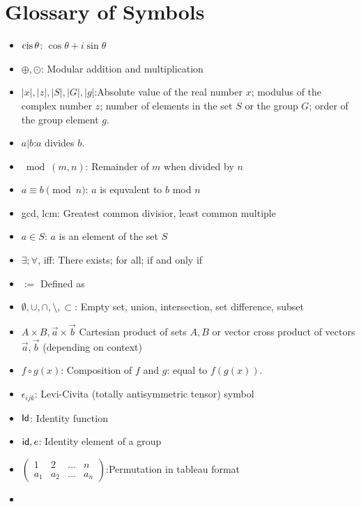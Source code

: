 \chapter*{Glossary of Symbols}\label{glossaryOfSymbols}

\begin{itemize}
\item[]
$\operatorname{cis} \theta$: \quad $\cos \theta + i \sin \theta$
\item[]
$\oplus, \odot$: \quad Modular addition and multiplication
\item[]
$|x|,|z|,|S|,|G|,|g|$:\quad Absolute value of the real number $x$; modulus of the complex number $z$; number of elements in the set $S$ or the group $G$; order of the group element $g$. 
\item[]
$a | b$:\quad $a$ divides $b$.
\item[]
 $\bmod(m,n)$: \quad Remainder of $m$ when divided by $n$
\item[]
$a \equiv b \pmod n $: \quad $a$ is equvalent to $b$ mod $n$
\item[]
gcd, lcm: \quad Greatest common divisior, least common multiple
\item[]
$a \in S$: \quad $a$ is an element of the set $S$
\item[]
$\exists; \forall$, iff: \quad There exists; for all; if and only if
\item[]
$:=$ \quad Defined as
\item[]
$\emptyset, \cup, \cap, \setminus, \subset$: \quad Empty set, union, intersection, set difference, subset
\item[]
$A\times B, \vec{a} \times \vec{b}$ \quad Cartesian product of sets $A,B$ or vector cross product of vectors $\vec{a},\vec{b}$ (depending on context)
\item[]
$f \circ g(x)$: \quad Composition of $f$ and $g$: equal to $f(g(x))$.
\item[]
$\epsilon_{ijk}$: \quad Levi-Civita (totally antisymmetric tensor) symbol
\item[]
${\sf{I}d}$: \quad Identity function
\item[]
${\sf{i}d}, e$: \quad Identity element of a group
\item[]
$\begin{pmatrix} 1 & 2 & \ldots & n\\ a_1 & a_2 & \ldots & a_n \end{pmatrix}$:\quad Permutation in tableau format
\item[]

\end{itemize}
